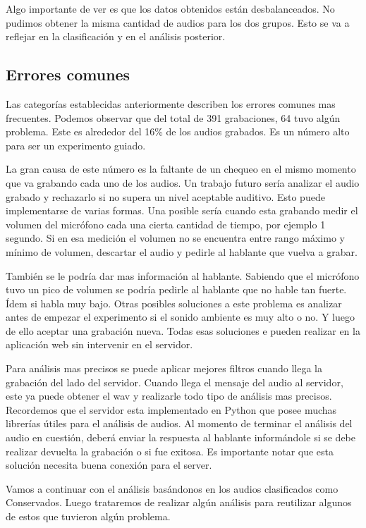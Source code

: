\documentclass[11pt,a4paper,twoside]{tesis}
\begin{document}
Algo importante de ver es que los datos obtenidos están desbalanceados. No pudimos obtener la misma cantidad de audios para los dos grupos. Esto se va a reflejar en la clasificación y en el análisis posterior.

\subsection{Errores comunes}

Las categorías establecidas anteriormente describen los errores comunes mas frecuentes. Podemos observar que del total de 391 grabaciones, 64 tuvo algún problema. Este es alrededor del 16\% de los audios grabados. Es un número alto para ser un experimento guiado. 

La gran causa de este número es la faltante de un chequeo en el mismo momento que va grabando cada uno de los audios. Un trabajo futuro sería analizar el audio grabado y rechazarlo si no supera un nivel aceptable auditivo. Esto puede implementarse de varias formas. Una posible sería cuando esta grabando medir el volumen del micrófono cada una cierta cantidad de tiempo, por ejemplo 1 segundo. Si en esa medición el volumen no se encuentra entre rango máximo y mínimo de volumen, descartar el audio y pedirle al hablante que vuelva a grabar.

También se le podría dar mas información al hablante. Sabiendo que el micrófono tuvo un pico de volumen se podría pedirle al hablante que no hable tan fuerte. Ídem si habla muy bajo. Otras posibles soluciones a este problema es analizar antes de empezar el experimento si el sonido ambiente es muy alto o no. Y luego de ello aceptar una grabación nueva. Todas esas soluciones e pueden realizar en la aplicación web sin intervenir en el servidor.

Para análisis mas precisos se puede aplicar mejores filtros cuando llega la grabación del lado del servidor. Cuando llega el mensaje del audio al servidor, este ya puede obtener el wav y realizarle todo tipo de análisis mas precisos. Recordemos que el servidor esta implementado en Python que posee muchas librerías útiles para el análisis de audios. Al momento de terminar el análisis del audio en cuestión, deberá enviar la respuesta al hablante informándole si se debe realizar devuelta la grabación o si fue exitosa. Es importante notar que esta solución necesita buena conexión para el server. 

Vamos a continuar con el análisis basándonos en los audios clasificados como Conservados. Luego trataremos de realizar algún análisis para reutilizar algunos de estos que tuvieron algún problema. 
\end{document}
